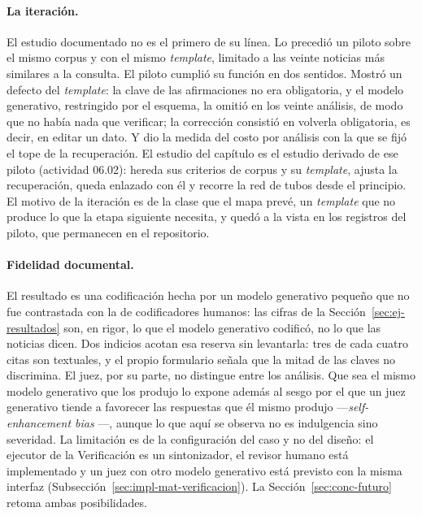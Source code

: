 \documentclass[12pt]{report}
\begin{document}
\paragraph{La iteración.} El estudio documentado no es el primero de su línea. Lo precedió un piloto sobre el mismo corpus y con el mismo \textit{template}, limitado a las veinte noticias más similares a la consulta. El piloto cumplió su función en dos sentidos. Mostró un defecto del \textit{template}: la clave de las afirmaciones no era obligatoria, y el modelo generativo, restringido por el esquema, la omitió en los veinte análisis, de modo que no había nada que verificar; la corrección consistió en volverla obligatoria, es decir, en editar un dato. Y dio la medida del costo por análisis con la que se fijó el tope de la recuperación. El estudio del capítulo es el estudio derivado de ese piloto (actividad 06.02): hereda sus criterios de corpus y su \textit{template}, ajusta la recuperación, queda enlazado con él y recorre la red de tubos desde el principio. El motivo de la iteración es de la clase que el mapa prevé, un \textit{template} que no produce lo que la etapa siguiente necesita, y quedó a la vista en los registros del piloto, que permanecen en el repositorio.

\paragraph{Fidelidad documental.} El resultado es una codificación hecha por un modelo generativo pequeño que no fue contrastada con la de codificadores humanos: las cifras de la Sección~\ref{sec:ej-resultados} son, en rigor, lo que el modelo generativo codificó, no lo que las noticias dicen. Dos indicios acotan esa reserva sin levantarla: tres de cada cuatro citas son textuales, y el propio formulario señala que la mitad de las claves no discrimina. El juez, por su parte, no distingue entre los análisis. Que sea el mismo modelo generativo que los produjo lo expone además al sesgo por el que un juez generativo tiende a favorecer las respuestas que él mismo produjo ---\textit{self-enhancement bias} \citep{zheng:2023}---, aunque lo que aquí se observa no es indulgencia sino severidad. La limitación es de la configuración del caso y no del diseño: el ejecutor de la Verificación es un sintonizador, el revisor humano está implementado y un juez con otro modelo generativo está previsto con la misma interfaz (Subsección~\ref{sec:impl-mat-verificacion}). La Sección~\ref{sec:conc-futuro} retoma ambas posibilidades.
\end{document}
